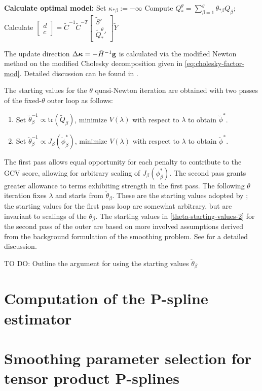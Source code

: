 \documentclass[12pt]{article}
\newcommand{\bfkappa}{\mbox{\boldmath $\kappa$}}
\newcommand{\tildeY}{\tilde{Y}}
\newcommand{\tildeQ}{\tilde{Q}}
\newcommand{\tildeS}{\tilde{S}}
\theoremstyle{definition}
\begin{document}
\begin{algorithm}[H]
\begin{algorithmic}
			\ENDIF
	\ENDWHILE
\STATE \textbf{Calculate optimal model:} 
		\STATE Set $\kappa_{*\beta} := -\infty$
	\ENDIF
	\STATE Compute $Q_*^\theta = \sum_{\beta = 1}^g \theta_{*\beta} Q_\beta$;
	\STATE Calculate $\begin{bmatrix} d \\ c \end{bmatrix} = \tilde{C}^{-1} \tilde{C}^{-T} \begin{bmatrix} \tildeS' \\ {\tildeQ_*^\theta}' \end{bmatrix} \tildeY$
					
\end{algorithmic}
\end{algorithm}

The update direction $\Delta \bfkappa = -\tilde{H}^{-1} \mathbf{g}$ is calculated via the modified Newton method on the modified Cholesky decomposition given in \ref{eq:cholesky-factor-mod}. Detailed discussion can be found in \citet{gill1981practical}.
\bigskip

The starting values for the $\theta$ quasi-Newton iteration are obtained with two passes of the fixed-$\theta$ outer loop as follows:

\begin{enumerate}
\item Set $\breve{\theta}_\beta^{-1} \propto \mbox{tr}\left( \tildeQ_\beta \right)$, minimize $V\left(\lambda\right)$ with respect to $\lambda$ to obtain $\breve{\phi}^*$. \label{theta-starting-values-1}
\item Set $\check{\theta}_\beta^{-1} \propto  J_\beta\left(\breve{\phi}^*_\beta \right)$, minimize $V\left(\lambda\right)$ with respect to $\lambda$ to obtain $\check{\phi}^*$. \label{theta-starting-values-2}
\end{enumerate}
\noindent
The first pass allows equal opportunity for each penalty to contribute to the GCV score, allowing for arbitrary scaling of $J_\beta \left(\phi^*_\beta\right)$. The second pass grants greater allowance to terms exhibiting strength in the first pass. The following $\theta$ iteration fixes $\lambda$ and starts from $\check{\theta}_\beta$. These are the starting values adopted by \citet{gu1991minimizing}; the starting values for the first pass loop are somewhat arbitrary, but are invariant to scalings of the $\theta_\beta$. The starting values in \ref{theta-starting-values-2} for the second pass of the outer are based on more involved assumptions derived from the background formulation of the smoothing problem. See \citet{gu1991minimizing} for a detailed discussion.

\bigskip
TO DO: Outline the argument for using the starting values $\breve{\theta}_\beta$
\bigskip



\section{Computation of the P-spline estimator}

\section{Smoothing parameter selection for tensor product P-splines}
\end{document}
